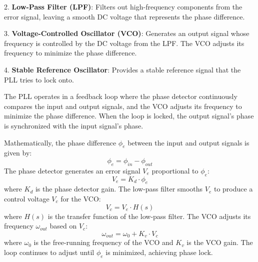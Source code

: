 2. \textbf{Low-Pass Filter (LPF)}: Filters out high-frequency components from the error signal, leaving a smooth DC voltage that represents the phase difference.

3. \textbf{Voltage-Controlled Oscillator (VCO)}: Generates an output signal whose frequency is controlled by the DC voltage from the LPF. The VCO adjusts its frequency to minimize the phase difference.

4. \textbf{Stable Reference Oscillator}: Provides a stable reference signal that the PLL tries to lock onto.

The PLL operates in a feedback loop where the phase detector continuously compares the input and output signals, and the VCO adjusts its frequency to minimize the phase difference. When the loop is locked, the output signal's phase is synchronized with the input signal's phase.

Mathematically, the phase difference $\phi_e$ between the input and output signals is given by:
\[
\phi_e = \phi_{in} - \phi_{out}
\]
The phase detector generates an error signal $V_e$ proportional to $\phi_e$:
\[
V_e = K_d \cdot \phi_e
\]
where $K_d$ is the phase detector gain. The low-pass filter smooths $V_e$ to produce a control voltage $V_c$ for the VCO:
\[
V_c = V_e \cdot H(s)
\]
where $H(s)$ is the transfer function of the low-pass filter. The VCO adjusts its frequency $\omega_{out}$ based on $V_c$:
\[
\omega_{out} = \omega_0 + K_v \cdot V_c
\]
where $\omega_0$ is the free-running frequency of the VCO and $K_v$ is the VCO gain. The loop continues to adjust until $\phi_e$ is minimized, achieving phase lock.

